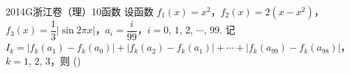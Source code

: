 
\begin{problem}{2014}{G}{浙江卷（理）}{10}{函数}
设函数 $ f_1(x)=x^2 $，$ f_2(x)=2(x-x^2) $，$ f_3(x)=\dfrac{1}{3}|\sin 2\pi x| $，$ a_i=\dfrac{i}{99} $，$ i=0,\,1,\,2,\,\cdots,\,99 $. 记 $ I_k=|f_k(a_1)-f_k(a_0)|+|f_k(a_2)-f_k(a_1)|+\cdots+|f_k(a_{99})-f_k(a_{98})| $，$ k=1,\,2,\,3 $，则 (\hspace{1cm})
\begin{choices}
\end{choices}
\end{problem}

\begin{answer}

\end{answer}

\begin{solutions}

\end{solutions}